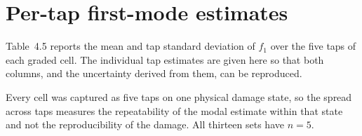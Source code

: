 %
%
%

\section{Per-tap first-mode estimates}
\label{app:pertap}

Table~4.5 reports the mean and tap standard deviation of $f_1$ over the five taps
of each graded cell. The individual tap estimates are given here so that both columns, and the
uncertainty derived from them, can be reproduced.

Every cell was captured as five taps on one physical damage state, so the spread
across taps measures the repeatability of the modal estimate within that state
and not the reproducibility of the damage. All thirteen sets have $n = 5$.

